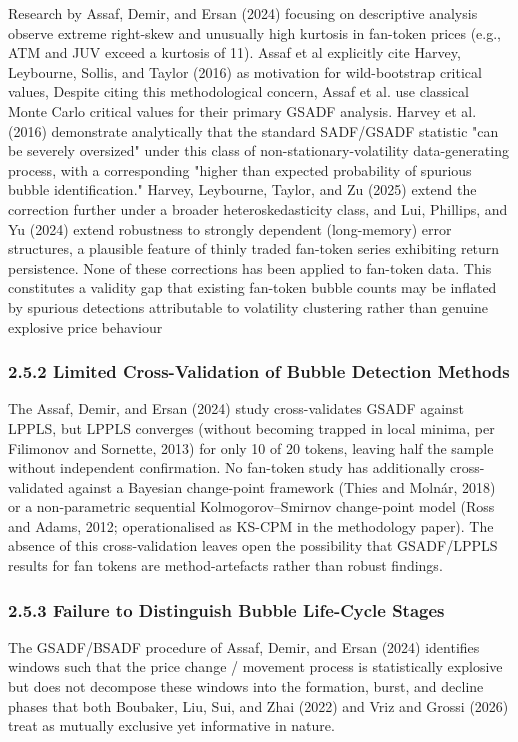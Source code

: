 \documentclass[11pt,a4paper,onecolumn]{article}
\begin{document}
Research by Assaf, Demir, and Ersan (2024) focusing on descriptive analysis observe extreme right-skew and unusually high kurtosis in fan-token prices (e.g., ATM and JUV exceed a kurtosis of 11). Assaf et al explicitly cite Harvey, Leybourne, Sollis, and Taylor (2016) as motivation for wild-bootstrap critical values, Despite citing this methodological concern, Assaf et al. use classical Monte Carlo critical values for their primary GSADF analysis. Harvey et al. (2016) demonstrate analytically that the standard SADF/GSADF statistic "can be severely oversized" under this class of non-stationary-volatility data-generating process, with a corresponding "higher than expected probability of spurious bubble identification." Harvey, Leybourne, Taylor, and Zu (2025) extend the correction further under a broader heteroskedasticity class, and Lui, Phillips, and Yu (2024) extend robustness to strongly dependent (long-memory) error structures, a plausible feature of thinly traded fan-token series exhibiting return persistence. None of these corrections has been applied to fan-token data. This constitutes a validity gap that existing fan-token bubble counts may be inflated by spurious detections attributable to volatility clustering rather than genuine explosive price behaviour

\subsubsection{2.5.2 Limited Cross-Validation of Bubble Detection Methods}

The Assaf, Demir, and Ersan (2024) study cross-validates GSADF against LPPLS, but LPPLS converges (without becoming trapped in local minima, per Filimonov and Sornette, 2013) for only 10 of 20 tokens, leaving half the sample without independent confirmation. No fan-token study has additionally cross-validated against a Bayesian change-point framework (Thies and Molnár, 2018) or a non-parametric sequential Kolmogorov–Smirnov change-point model (Ross and Adams, 2012; operationalised as KS-CPM in the methodology paper). The absence of this cross-validation leaves open the possibility that GSADF/LPPLS results for fan tokens are method-artefacts rather than robust findings.

\subsubsection{2.5.3 Failure to Distinguish Bubble Life-Cycle Stages}

The GSADF/BSADF procedure of Assaf, Demir, and Ersan (2024) identifies windows such that the price change / movement process is statistically explosive but does not decompose these windows into the formation, burst, and decline phases that both Boubaker, Liu, Sui, and Zhai (2022) and Vriz and Grossi (2026) treat as mutually exclusive yet informative in nature.
\end{document}
